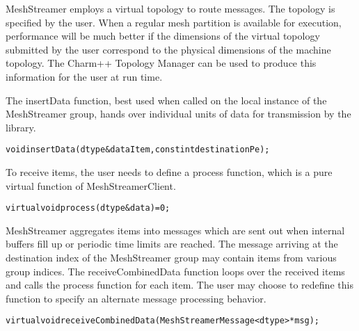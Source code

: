 MeshStreamer employs a virtual topology to route messages. The
topology is specified by the user. When a regular mesh partition is
available for execution, performance will be much better if the
dimensions of the virtual topology submitted by the user correspond to
the physical dimensions of the machine topology. The Charm++ Topology
Manager can be used to produce this information for the user at run
time. 

The insertData function, best used when called on the local instance
of the MeshStreamer group, hands over individual units of data for
transmission by the library. 

\begin{alltt}
void insertData(dtype &dataItem, const int destinationPe); 
\end{alltt}

To receive items, the user needs to define a process function, which
is a pure virtual function of MeshStreamerClient.

\begin{alltt}
virtual void process(dtype &data)=0; 
\end{alltt}

MeshStreamer aggregates items into messages which are sent out when
internal buffers fill up or periodic time limits are reached. The
message arriving at the destination index of the MeshStreamer group
may contain items from various group indices. The receiveCombinedData
function loops over the received items and calls the process function
for each item. The user may choose to redefine this function to
specify an alternate message processing behavior. 

\begin{alltt}
virtual void receiveCombinedData(MeshStreamerMessage<dtype> *msg);
\end{alltt}

